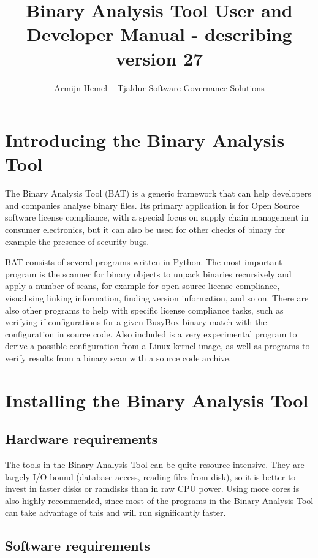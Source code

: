 \documentclass[10pt,a4paper]{article}
\author{Armijn Hemel -- Tjaldur Software Governance Solutions}
\title{Binary Analysis Tool User and Developer Manual - describing version 27}
\begin{document}
\maketitle
\thispagestyle{empty}

\tableofcontents

\section{Introducing the Binary Analysis Tool}

The Binary Analysis Tool (BAT) is a generic framework that can help developers
and companies analyse binary files. Its primary application is for Open Source
software license compliance, with a special focus on supply chain management
in consumer electronics, but it can also be used for other checks of binary
for example the presence of security bugs.

BAT consists of several programs written in Python. The most important program
is the scanner for binary objects to unpack binaries recursively and apply a
number of scans, for example for open source license compliance, visualising
linking information, finding version information, and so on. There are also
other programs to help with specific license compliance tasks, such as
verifying if configurations for a given BusyBox binary match with the
configuration in source code. Also included is a very experimental program to
derive a possible configuration from a Linux kernel image, as well as programs
to verify results from a binary scan with a source code archive.

\section{Installing the Binary Analysis Tool}

\subsection{Hardware requirements}

The tools in the Binary Analysis Tool can be quite resource intensive. They
are largely I/O-bound (database access, reading files from disk), so it is
better to invest in faster disks or ramdisks than in raw CPU power. Using more
cores is also highly recommended, since most of the programs in the Binary
Analysis Tool can take advantage of this and will run significantly faster.

\subsection{Software requirements}
\end{document}
